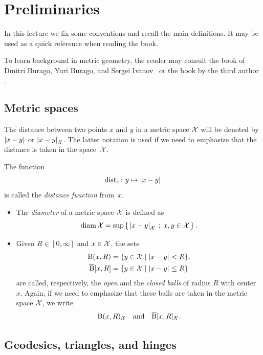 \chapter{Preliminaries}\label{prelim}

In this lecture we fix some conventions and recall the main definitions.
It may be used as a quick reference when reading the book.

To learn background in metric geometry, the reader  may consult the book of Dmitri Burago, Yuri Burago, and Sergei Ivanov~\cite{burago-burago-ivanov}
or the book by the third author \cite{petrunin-2023}.
 

\section{Metric spaces}
\label{sec:metric spaces}


The distance between two points $x$ and $y$ in a metric space $\mathcal{X}$ will be denoted by $\dist{x}{y}{}$ or $\dist{x}{y}{\spc{X}}$.
The latter notation is used if we need to emphasize 
that the distance is taken in the space~${\mathcal{X}}$.

The function 
\[\distfun_x\:y\mapsto \dist{x}{y}{}\]
is called the \emph{distance function} from~$x$. 

\begin{itemize}
\item The \emph{diameter} of a metric space $\mathcal{X}$ is defined as
\[\diam \spc{X}=\sup\set{\dist{x}{y}{\spc{X}}}{x,y\in \spc{X}}.\]

\item Given $R\in[0,\infty]$ and $x\in \spc{X}$, the sets
\begin{align*}
\oBall(x,R)&=\{y\in \spc{X}\mid \dist{x}{y}{}<R\},
\\
\cBall[x,R]&=\{y\in \spc{X}\mid \dist{x}{y}{}\le R\}
\end{align*}
are called, respectively, the  \emph{open} and  the \emph{closed  balls}   of radius $R$ with center~$x$.
Again, if we need to emphasize that these balls are taken in the metric space $\mathcal{X}$,
we write 
\[\mathrm{B}{}(x,R)_{\mathcal{X}}\quad\text{and}\quad\overline{\mathrm{B}}{}[x,R]_{\mathcal{X}}.\]
\end{itemize}

\section{Geodesics, triangles, and hinges}
\label{sec:geods}

